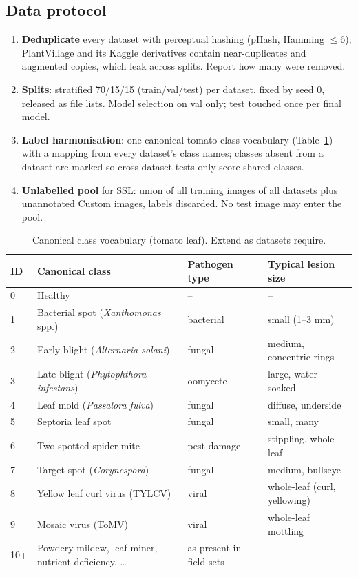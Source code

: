 \subsection{Data protocol}
\label{sec:data_protocol}
\begin{enumerate}
  \item \textbf{Deduplicate} every dataset with perceptual hashing (pHash, Hamming $\le 6$); PlantVillage and its Kaggle derivatives contain near-duplicates and augmented copies, which leak across splits. Report how many were removed.
  \item \textbf{Splits}: stratified 70/15/15 (train/val/test) per dataset, fixed by seed 0, released as file lists. Model selection on val only; test touched once per final model.
  \item \textbf{Label harmonisation}: one canonical tomato class vocabulary (Table~\ref{tab:classes}) with a mapping from every dataset's class names; classes absent from a dataset are marked so cross-dataset tests only score shared classes.
  \item \textbf{Unlabelled pool} for SSL: union of all training images of all datasets plus unannotated Custom images, labels discarded. No test image may enter the pool.
\end{enumerate}

\begin{table}[H]
\centering\small
\caption{Canonical class vocabulary (tomato leaf). Extend as datasets require.}\label{tab:classes}
\begin{tabular}{@{}llll@{}}
\toprule
ID & Canonical class & Pathogen type & Typical lesion size \\
\midrule
0 & Healthy & -- & -- \\
1 & Bacterial spot (\emph{Xanthomonas} spp.) & bacterial & small (1--3 mm) \\
2 & Early blight (\emph{Alternaria solani}) & fungal & medium, concentric rings \\
3 & Late blight (\emph{Phytophthora infestans}) & oomycete & large, water-soaked \\
4 & Leaf mold (\emph{Passalora fulva}) & fungal & diffuse, underside \\
5 & Septoria leaf spot & fungal & small, many \\
6 & Two-spotted spider mite & pest damage & stippling, whole-leaf \\
7 & Target spot (\emph{Corynespora}) & fungal & medium, bullseye \\
8 & Yellow leaf curl virus (TYLCV) & viral & whole-leaf (curl, yellowing) \\
9 & Mosaic virus (ToMV) & viral & whole-leaf mottling \\
10+ & Powdery mildew, leaf miner, nutrient deficiency, \dots & as present in field sets & -- \\
\bottomrule
\end{tabular}
\end{table}

